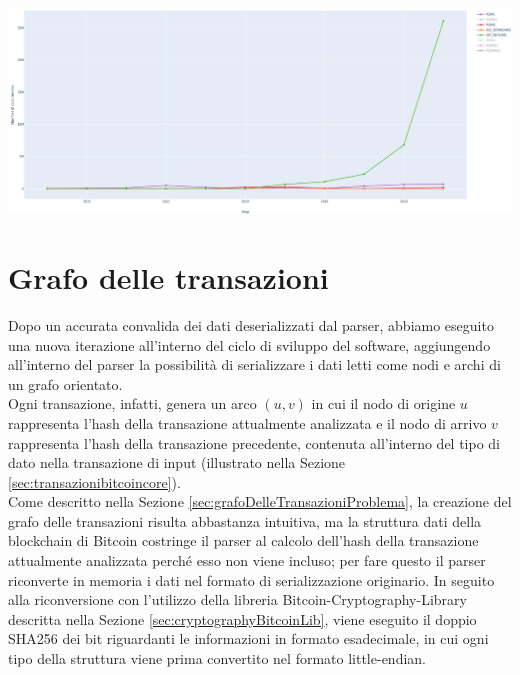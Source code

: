 {\centering
\vspace{15pt}
\includegraphics[scale=0.25]{images/OP_RETUTN_chart.png}
\vspace{10pt}
\par}


\section{Grafo delle transazioni} \label{sec:solGraphTX}

Dopo un accurata convalida dei dati deserializzati dal parser, abbiamo eseguito una nuova iterazione all'interno del ciclo di sviluppo del software, aggiungendo all'interno del parser la possibilità di serializzare i dati letti come nodi e archi di un grafo orientato.\\
Ogni transazione, infatti, genera un arco $(u, v)$ in cui il nodo di origine $u$ rappresenta l'hash della transazione attualmente analizzata e il nodo di arrivo $v$ rappresenta l'hash della transazione precedente, contenuta all'interno del tipo di dato  nella transazione di input (illustrato nella Sezione \ref{sec:transazionibitcoincore}).\\
Come descritto nella Sezione \ref{sec:grafoDelleTransazioniProblema}, la creazione del grafo delle transazioni risulta abbastanza intuitiva, ma la struttura dati della blockchain di Bitcoin costringe il parser al calcolo dell'hash della transazione attualmente analizzata perché esso non viene incluso; per fare questo il parser riconverte in memoria i dati nel formato di serializzazione originario.
In seguito alla riconversione con l'utilizzo della libreria Bitcoin-Cryptography-Library descritta nella Sezione \ref{sec:cryptographyBitcoinLib}, viene eseguito il doppio SHA256 dei bit riguardanti le informazioni in formato esadecimale, in cui ogni tipo della struttura viene prima convertito nel formato little-endian.\\

